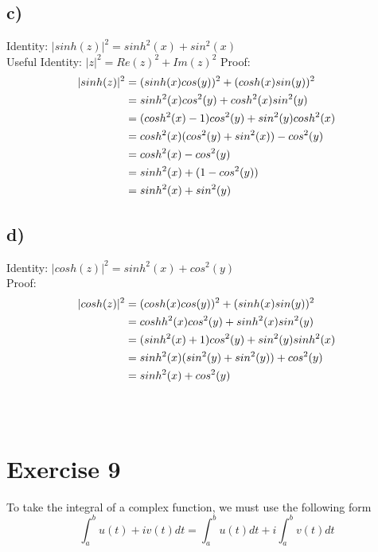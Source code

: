 \documentclass[notitlepage]{article}
\newcommand{\HwBreak}{%
  \par\noindent\makebox[\linewidth]{\rule{0.9\paperwidth}{0.4pt}}\par%
}
\begin{document}
\subsection*{c)}
    Identity: $|sinh(z)|^2 = sinh^2(x) + sin^2(x)$ \\
    Useful Identity: $|z|^2 = Re(z)^2 + Im(z)^2$
    Proof: \\
\begin{equation}
    \begin{aligned}
        |sinh(z)|^2     &= (sinh(x)cos(y))^2+(cosh(x)sin(y))^2 \notag \\
                        &= sinh^2(x)cos^2(y) + cosh^2(x)sin^2(y) \\
                        &= (cosh^2(x)-1)cos^2(y) + sin^2(y)cosh^2(x) \\
                        &= cosh^2(x)(cos^2(y)+sin^2(x)) - cos^2(y) \\
                        &= cosh^2(x) - cos^2(y) \\
                        &= sinh^2(x) + (1 - cos^2(y)) \\
                        &= sinh^2(x) + sin^2(y)
    \end{aligned}
\end{equation}

\subsection*{d)}
    Identity: $|cosh(z)|^2 = sinh^2(x) + cos^2(y)$ \\
    Proof: \\
\begin{equation}
    \begin{aligned}
        |cosh(z)|^2     &= (cosh(x)cos(y))^2+(sinh(x)sin(y))^2 \notag \\
                        &= coshh^2(x)cos^2(y) + sinh^2(x)sin^2(y) \\
                        &= (sinh^2(x)+1)cos^2(y) + sin^2(y)sinh^2(x) \\
                        &= sinh^2(x)(sin^2(y)+sin^2(y)) + cos^2(y) \\
                        &= sinh^2(x) + cos^2(y)
    \end{aligned}
\end{equation} \\~\\

\HwBreak
\section*{Exercise 9}
 To take the integral of a complex function, we must use the following form
    $$\int_a^b{u(t)+iv(t)dt} = \int_a^b{u(t)dt} + i \int_a^b{v(t)dt}$$
\end{document}
